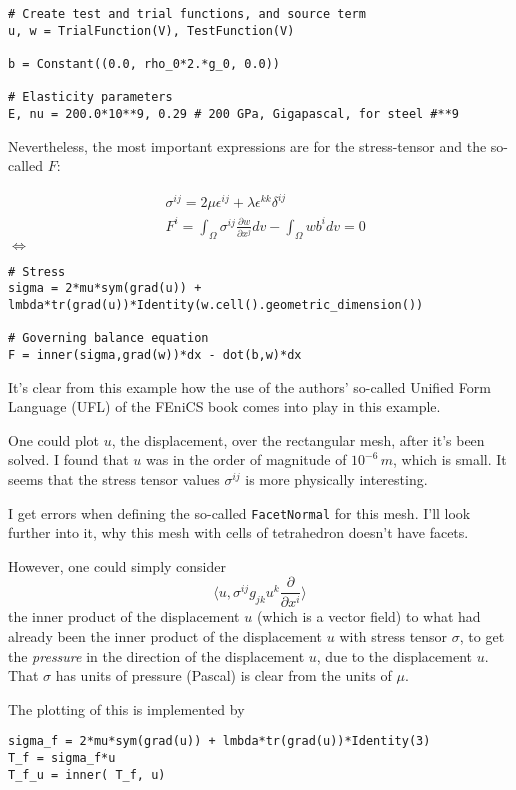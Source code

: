 \documentclass[twoside,landscape,10pt]{amsart}
\theoremstyle{plain}
\theoremstyle{definition}
\theoremstyle{remark}
\begin{document}
\begin{multicols*}{2}
\begin{lstlisting}
# Create test and trial functions, and source term
u, w = TrialFunction(V), TestFunction(V)

b = Constant((0.0, rho_0*2.*g_0, 0.0))

# Elasticity parameters
E, nu = 200.0*10**9, 0.29 # 200 GPa, Gigapascal, for steel #**9

\end{lstlisting}

Nevertheless, the most important expressions are for the stress-tensor and the so-called $F$:

\[
\begin{aligned}
  & \sigma^{ij} = 2 \mu \epsilon^{ij} + \lambda \epsilon^{kk} \delta^{ij} \\
  & F^i = \int_{\Omega} \sigma^{ij} \frac{ \partial w}{ \partial x^j} dv - \int_{\Omega} wb^i dv = 0 
\end{aligned}
\]
$\Longleftrightarrow$

\begin{lstlisting}
# Stress
sigma = 2*mu*sym(grad(u)) + lmbda*tr(grad(u))*Identity(w.cell().geometric_dimension())

# Governing balance equation
F = inner(sigma,grad(w))*dx - dot(b,w)*dx
\end{lstlisting}

It's clear from this example how the use of the authors' so-called Unified Form Language (UFL) of the FEniCS book \cite{FEniCS} comes into play in this example.  

One could plot $u$, the displacement, over the rectangular mesh, after it's been solved.  I found that $u$ was in the order of magnitude of $10^{-6} \, m$, which is small.  It seems that the stress tensor values $\sigma^{ij}$ is more physically interesting.  

I get errors when defining the so-called \verb|FacetNormal| for this mesh.  I'll look further into it, why this mesh with cells of tetrahedron doesn't have facets.  

However, one could simply consider 
\[
\langle u, \sigma^{ij}g_{jk}u^k \frac{\partial}{ \partial x^i} \rangle
\]
the inner product of the displacement $u$ (which is a vector field) to what had already been the inner product of the displacement $u$ with stress tensor $\sigma$, to get the \emph{pressure} in the direction of the displacement $u$, due to the displacement $u$.  That $\sigma$ has units of pressure (Pascal) is clear from the units of $\mu$.  

The plotting of this is implemented by 
\begin{lstlisting}
sigma_f = 2*mu*sym(grad(u)) + lmbda*tr(grad(u))*Identity(3)
T_f = sigma_f*u
T_f_u = inner( T_f, u)


\end{lstlisting}
\end{multicols*}
\end{document}
